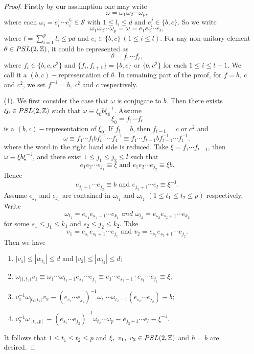 \documentclass[10pt,a4paper]{amsart}
\begin{document}
    \begin{proof}
        Firstly by our assumption one may write
        \[\omega=\omega_1\omega_2\cdots\omega_p,\]
        where each $\omega_i=e_i^1\cdots e_i^{l_i}\in\mathcal{S}$ with $1\leq l_i\leq d$ and $e_i^j \in \{b,c\}$. So we write 
        $$\omega_1\omega_2\cdots\omega_p=\omega=e_1e_2\cdots e_l,$$
        where $l=\sum_{i=1}^{p}l_i\leq pd$ and $e_i\in\{b,c\}\ (1\leq i\leq l)$. For any non-unitary element $\theta\in\textnormal{PSL}(2,\mathbb{Z})$, it could be represented as 
        $$\theta=f_1\cdots f_t,$$
        where $f_i\in\{b,c,c^2\}$ and $\{f_i,f_{i+1}\}=\{b,c\}$ or $\{b,c^2\}$ for each $1\leq i\leq t-1$. We call it a $(b,c)-$representation of $\theta$.  In remaining part of the proof, for $f=b,\ c$ and $c^2$, we set $f^{-1}=b,\ c^2$ and $c$ respectively.
        
       (1). We first consider the case that $\omega$ is conjugate to $b$. Then there exists $\xi_0\in\textnormal{PSL}(2,\mathbb{Z})$  such that $\omega\equiv \xi_0 b \xi_0^{-1}$. Assume 
       $$\xi_0=f_1\cdots f_t$$
       is a $(b,c)-$representation of $\xi_0$. 
       If $f_t=b$, then $f_{t-1}=c$ or $c^2$ and  
       $$\omega\equiv f_1\cdots f_tbf_t^{-1}\cdots f_1^{-1}\equiv f_1\cdots f_{t-1}b f_{t-1}^{-1}\cdots f_1^{-1},$$
       where the word in the right hand side is reduced. Take $\xi=f_1\cdots f_{t-1}$, then $\omega\equiv \xi b \xi^{-1}$, and there exist $1\leq j_1\leq j_2\leq l$ such that 
        $$e_1e_2\cdots e_{j_1}\equiv \xi\text{ and }e_1e_2\cdots e_{j_2}\equiv \xi b.$$
        Hence 
        $$e_{j_1+1}\cdots e_{j_2}\equiv b\text{ and }e_{j_2+1}\cdots e_l\equiv \xi^{-1}.$$
        Assume $e_{j_1}$ and $e_{j_2}$ are contained in $\omega_{t_1}$ and $\omega_{t_2}$ $(1\leq t_1\leq t_2\leq p)$ respectively. Write 
        $$\omega_{t_1}=e_{s_1}e_{s_1+1}\cdots e_{k_1} \textit{ \ and \ } \omega_{t_2}=e_{s_2}e_{s_2+1}\cdots e_{k_2}$$
        for some $s_1\leq j_1\leq k_1$ and $s_2\leq j_2\leq k_2$.        Take $$v_1=e_{s_1}e_{s_1+1}\cdots e_{j_1} \text{ and }v_2=e_{s_2}e_{s_2+1}\cdots e_{j_2}.$$ Then we have 
        \begin{enumerate}
            \item $|v_1|\leq|w_{t_1}|\leq d\text{ and }|v_2|\leq|w_{t_2}|\leq d$;
            \item $\omega_{[1,t_1)}v_1\equiv\omega_1\cdots \omega_{t_1-1}e_{s_1}\cdots e_{j_1}\equiv e_1\cdots e_{s_1-1} \cdot e_{s_1}\cdots e_{j_1}\equiv \xi$;
            \item $
        v_1^{-1}\omega_{[t_1,t_2)}v_2\equiv (e_{s_1}\cdots e_{j_1})^{-1}\omega_{t_1}\cdots \omega_{t_2-1}(e_{s_2}\cdots e_{j_2})\equiv b;$
        \item $v_2^{-1}\omega_{[t_2,p]}\equiv (e_{s_2}\cdots e_{j_2})^{-1}\omega_{t_2}\cdots \omega_p\equiv e_{j_2+1}\cdots e_l\equiv \xi^{-1}$.
        \end{enumerate}
        It follows that $1\leq t_1\leq t_2\leq p$ and $\xi,\ v_1,\ v_2\in\textnormal{PSL}(2,\mathbb{Z})$ and $h=b$ are desired. 
        

\end{proof}
\end{document}
